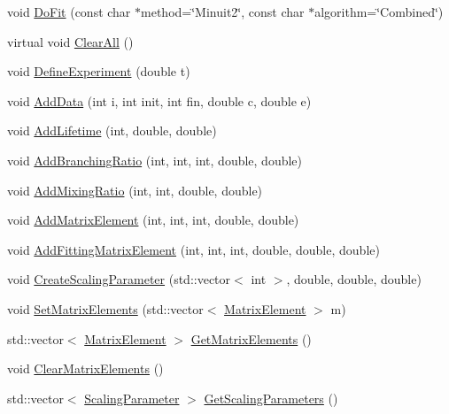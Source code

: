 \begin{DoxyCompactItemize}
\item 
void \hyperlink{classCoulExFitter_a08b4d7487381e52c0da70ab809e70fd4}{Do\-Fit} (const char $\ast$method=\char`\"{}Minuit2\char`\"{}, const char $\ast$algorithm=\char`\"{}Combined\char`\"{})
\item 
virtual void \hyperlink{classCoulExFitter_a3dc34ce26c8906acefada4da62ebe27f}{Clear\-All} ()
\item 
void \hyperlink{classCoulExFitter_adf6c8ef07257352eee65ad39eb900eb1}{Define\-Experiment} (double t)
\item 
void \hyperlink{classCoulExFitter_a81f503e2d4de8f39ad33b98327e5b8ab}{Add\-Data} (int i, int init, int fin, double c, double e)
\item 
void \hyperlink{classCoulExFitter_a5e2fa54175664c1ff80ec1562d7deb9d}{Add\-Lifetime} (int, double, double)
\item 
void \hyperlink{classCoulExFitter_a483e51a7fd5262d65b94f3d0e9d9a2b1}{Add\-Branching\-Ratio} (int, int, int, double, double)
\item 
void \hyperlink{classCoulExFitter_a6359add575cbb5eaa3f1f0a04a108643}{Add\-Mixing\-Ratio} (int, int, double, double)
\item 
void \hyperlink{classCoulExFitter_ae2580c027c32cdd4eb5d4e6283b8bca1}{Add\-Matrix\-Element} (int, int, int, double, double)
\item 
void \hyperlink{classCoulExFitter_a8d2a0995d0d2239629e23810362177b8}{Add\-Fitting\-Matrix\-Element} (int, int, int, double, double, double)
\item 
void \hyperlink{classCoulExFitter_a5241e2d16d908fc409a2bd078846fa5e}{Create\-Scaling\-Parameter} (std\-::vector$<$ int $>$, double, double, double)
\item 
void \hyperlink{classCoulExFitter_a3ed4407b3cbd821bafc4aabc13dfd44a}{Set\-Matrix\-Elements} (std\-::vector$<$ \hyperlink{classMatrixElement}{Matrix\-Element} $>$ m)
\item 
std\-::vector$<$ \hyperlink{classMatrixElement}{Matrix\-Element} $>$ \hyperlink{classCoulExFitter_ae866bffb9fe2ef25c03e79cedd1357a8}{Get\-Matrix\-Elements} ()
\item 
void \hyperlink{classCoulExFitter_a3e300781a246a5f162a8c12b1d1d5461}{Clear\-Matrix\-Elements} ()
\item 
std\-::vector$<$ \hyperlink{classScalingParameter}{Scaling\-Parameter} $>$ \hyperlink{classCoulExFitter_a1eeaeb97c9f1133f1d8140bee0deddad}{Get\-Scaling\-Parameters} ()
\item 

\end{DoxyCompactItemize}
